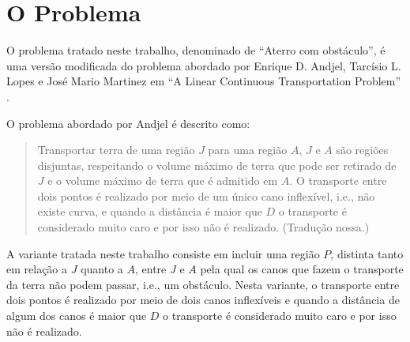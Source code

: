 %
%
%

\section{O Problema}
O problema tratado neste trabalho, denominado de ``Aterro com obstáculo'', é uma
versão modificada do problema abordado por Enrique D. Andjel, Tarcísio L. Lopes
e José Mario Martinez em ``A Linear Continuous Transportation Problem''
\cite{Andjel:1989:TP}.

O problema abordado por Andjel é descrito como:
\begin{quotation}
    Transportar terra de uma região $J$ para uma região $A$, $J$ e $A$ são
    regiões disjuntas, respeitando o volume máximo de terra que pode ser
    retirado de $J$ e o volume máximo de terra que é admitido em $A$. O
    transporte entre dois pontos é realizado por meio de um único cano
    inflexível, i.e., não existe curva, e quando a distância é maior que $D$ o
    transporte é considerado muito caro e por isso não é realizado. (Tradução
    nossa.)
\end{quotation}

A variante tratada neste trabalho consiste em incluir uma região $P$, distinta
tanto em relação a $J$ quanto a $A$, entre $J$ e $A$ pela qual os canos que
fazem o transporte da terra não podem passar, i.e., um obstáculo. Nesta variante,
o transporte entre dois pontos é realizado por meio de dois canos inflexíveis e
quando a distância de algum dos canos é maior que $D$ o transporte é considerado
muito caro e por isso não é realizado.
